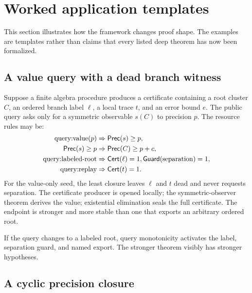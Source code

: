 \section{Worked application templates}
\label{sec:applications}

This section illustrates how the framework changes proof shape.  The examples
are templates rather than claims that every listed deep theorem has now been
formalized.

\subsection{A value query with a dead branch witness}

Suppose a finite algebra procedure produces a certificate containing a root
cluster \(C\), an ordered branch label \(\ell\), a local trace \(t\), and an
error bound \(e\).  The public query asks only for a symmetric observable
\(s(C)\) to precision \(p\).  The resource rules may be:
\begin{align*}
  \text{query:value}(p)&\Rightarrow \mathsf{Prec}(s)\ge p,\\
  \mathsf{Prec}(s)\ge p&\Rightarrow \mathsf{Prec}(C)\ge p+c,\\
  \text{query:labeled-root}&\Rightarrow \mathsf{Cert}(\ell)=1,
       \mathsf{Guard}(\text{separation})=1,\\
  \text{query:replay}&\Rightarrow \mathsf{Cert}(t)=1.
\end{align*}
For the value-only seed, the least closure leaves \(\ell\) and \(t\) dead and
never requests separation.  The certificate producer is opened locally; the
symmetric-observer theorem derives the value; existential elimination seals
the full certificate.  The endpoint is stronger and more stable than one that
exports an arbitrary ordered root.

If the query changes to a labeled root, query monotonicity activates the label,
separation guard, and named export.  The stronger theorem visibly has stronger
hypotheses.

\subsection{A cyclic precision closure}

